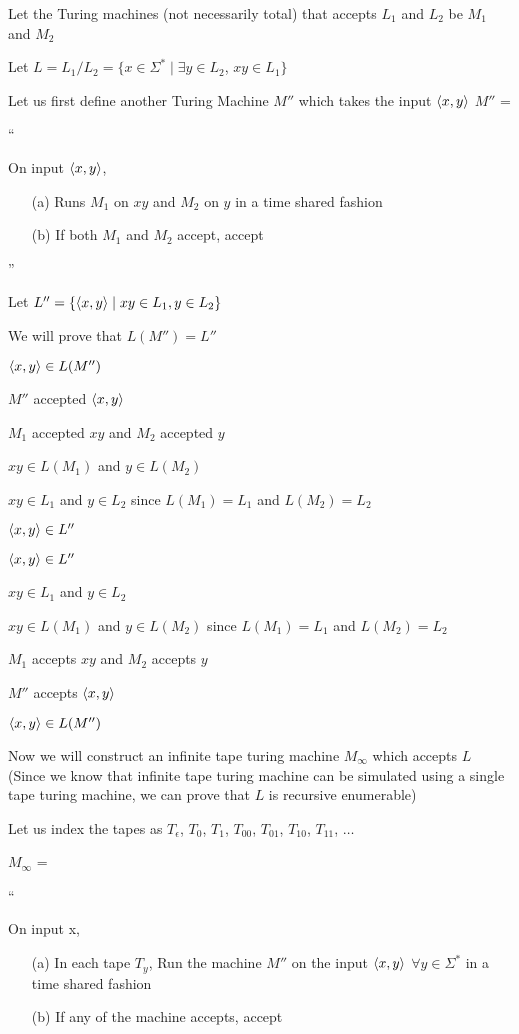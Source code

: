 
Let the Turing machines (not necessarily total) that accepts $L_1$ and $L_2$ be $M_1$ and $M_2$

Let $L = L_1 / L_2 = \{x \in \Sigma^* \mid \exists y \in L_2$, $xy \in L_1\}$

Let us first define another Turing Machine $M''$ which takes the input $\langle x, y \rangle$  
$M''$ = 

``

On input $\langle x, y \rangle$,
\begin{enumerate}
    \item[(a)] Runs $M_1$ on $xy$ and $M_2$ on $y$ in a time shared fashion
    \item[(b)] If both $M_1$ and $M_2$ accept, accept 
\end{enumerate}

''

Let $L'' = \{\langle x, y \rangle \mid xy \in L_1, y \in L_2\}$

We will prove that $L(M'') = L''$

$ \langle x, y \rangle \in L(M'') $

\imp
$M''$ accepted $\langle x, y \rangle$

\imp
$M_1$ accepted $xy$ and $M_2$ accepted $y$

\imp
$xy \in L(M_1)$ and $y \in L(M_2)$

\imp
$xy \in L_1$ and $y \in L_2$ since $L(M_1) = L_1$ and $L(M_2) = L_2$

\imp
$\langle x, y \rangle \in L''$


$\langle x, y \rangle \in L''$

\imp
$xy \in L_1$ and $y \in L_2$ 

\imp
$xy \in L(M_1)$ and $y \in L(M_2)$ since $L(M_1) = L_1$ and $L(M_2) = L_2$ 

\imp
$M_1$ accepts $xy$ and $M_2$ accepts $y$

\imp
$M''$ accepts $\langle x, y \rangle$

\imp
$\langle x, y \rangle \in L(M'')$

Now we will construct an infinite tape turing machine $M_\infty$ which accepts $L$ (Since we know that infinite tape turing machine can be simulated using a single tape turing machine, we can prove that $L$ is recursive enumerable)

Let us index the tapes as $T_\epsilon$, $T_0$, $T_1$, $T_{00}$, $T_{01}$, $T_{10}$, $T_{11}$, $\dots$

$M_\infty$ = 

``

On input x,
\begin{enumerate}
    \item[(a)] In each tape $T_y$, Run the machine $M''$ on the input $\langle x, y \rangle$ $\forall y \in \Sigma^*$ in a time shared fashion 
    \item[(b)] If any of the machine accepts, accept
\end{enumerate}

